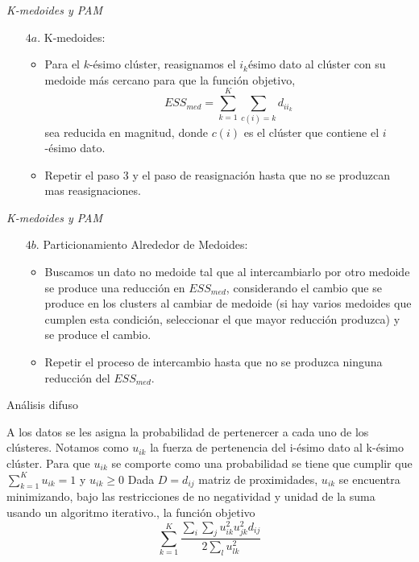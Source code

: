 \documentclass[spanish]{beamer}
\begin{document}
\begin{frame}{\textit{K-medoides y PAM}}
\begin{enumerate}

\item[$4a.$] K-medoides:
\begin{itemize}
\item Para el $k$-ésimo clúster, reasignamos el $i_k$ésimo dato al clúster con su medoide más cercano para que la función objetivo, $$ESS_{med}=\sum_{k=1}^{K}\sum_{c(i)=k}d_{ii_k}$$
sea reducida en magnitud, donde $c(i)$ es el clúster que contiene el $i$-ésimo dato.
\item Repetir el paso 3 y el paso de reasignación hasta que no se produzcan mas reasignaciones.
\end{itemize}

\end{enumerate}

\end{frame}


\begin{frame}{\textit{K-medoides y PAM}}
\begin{enumerate}

\item[$4b.$] Particionamiento Alrededor de Medoides:

\begin{itemize}
\item Buscamos un dato no medoide tal que al intercambiarlo por otro medoide se produce una reducción en $ESS_{med}$, considerando el cambio que se produce en los clusters al cambiar de medoide (si hay varios medoides que cumplen esta condición, seleccionar el que mayor reducción produzca) y se produce el cambio.

\item Repetir el proceso de intercambio hasta que no se produzca ninguna reducción del $ESS_{med}$.
\end{itemize}
\end{enumerate}

\end{frame}

\begin{frame}{Análisis difuso}

A los datos se les asigna la probabilidad de pertenercer a cada uno de los clústeres. Notamos como $u_{ik}$ la fuerza de pertenencia del i-ésimo dato al k-ésimo clúster.
\newline
\newline
Para que $u_{ik}$ se comporte como una probabilidad se tiene que cumplir que $\sum_{k=1}^Ku_{ik}=1$ y $u_{ik}\geq0$
\newline
\newline
Dada $D=d_{ij}$ matriz de proximidades, $u_{ik}$ se encuentra minimizando, bajo las restricciones de no negatividad y unidad de la suma usando un algoritmo iterativo., la función objetivo
$$\sum_{k=1}^{K}\frac{\sum_i\sum_ju_{ik}^2u_{jk}^2d_{ij}}{2\sum_lu_{lk}^2}$$
\end{frame}
\end{document}
